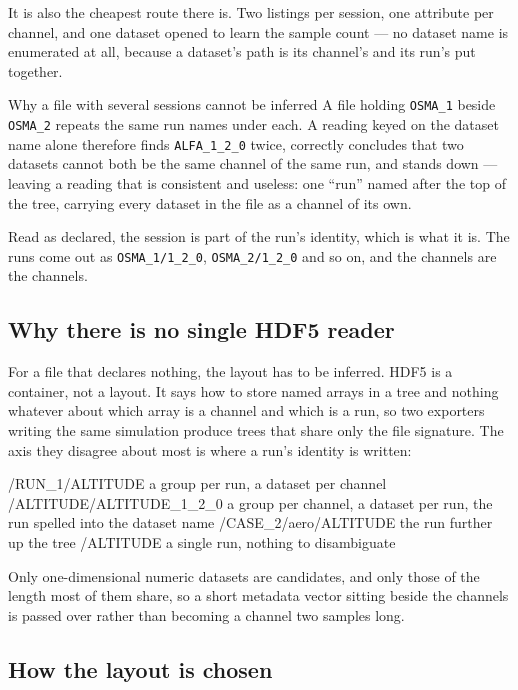 \documentclass[11pt,a4paper,oneside]{report}
\newcommand{\code}[1]{\texttt{#1}}
\begin{document}
It is also the cheapest route there is. Two listings per session, one attribute
per channel, and one dataset opened to learn the sample count --- no dataset
name is enumerated at all, because a dataset's path is its channel's and its
run's put together.

\begin{aoenote}{Why a file with several sessions cannot be inferred}
A file holding \code{OSMA\_1} beside \code{OSMA\_2} repeats the same run names
under each. A reading keyed on the dataset name alone therefore finds
\code{ALFA\_1\_2\_0} twice, correctly concludes that two datasets cannot both
be the same channel of the same run, and stands down --- leaving a reading
that is consistent and useless: one ``run'' named after the top of the tree,
carrying every dataset in the file as a channel of its own.

Read as declared, the session is part of the run's identity, which is what it
is. The runs come out as \code{OSMA\_1/1\_2\_0}, \code{OSMA\_2/1\_2\_0} and so
on, and the channels are the channels.
\end{aoenote}

\subsection*{Why there is no single HDF5 reader}

For a file that declares nothing, the layout has to be inferred.
HDF5 is a container, not a layout. It says how to store named arrays in a tree
and nothing whatever about which array is a channel and which is a run, so two
exporters writing the same simulation produce trees that share only the file
signature. The axis they disagree about most is where a run's identity is
written:

\begin{aoecode}
/RUN_1/ALTITUDE            a group per run, a dataset per channel
/ALTITUDE/ALTITUDE_1_2_0   a group per channel, a dataset per run, the
                           run spelled into the dataset name
/CASE_2/aero/ALTITUDE      the run further up the tree
/ALTITUDE                  a single run, nothing to disambiguate
\end{aoecode}

Only one-dimensional numeric datasets are candidates, and only those of the
length most of them share, so a short metadata vector sitting beside the
channels is passed over rather than becoming a channel two samples long.

\subsection*{How the layout is chosen}
\end{document}
